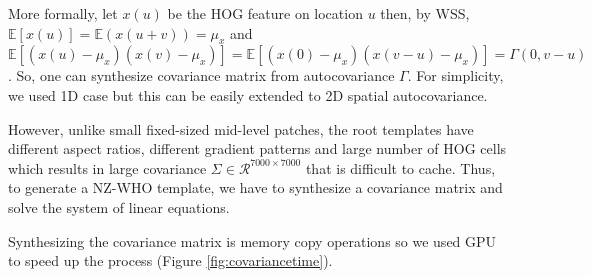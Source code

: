 \documentclass[10pt,twocolumn,letterpaper]{article}
\begin{document}

More formally, let $x(u)$ be the HOG feature on location $u$ then, by WSS, $\mathbb{E}\left[x(u)\right] = \mathbb{E}(x(u+v)) = \mu_x$ and $\mathbb{E}\left[(x(u)-\mu_x)(x(v)-\mu_x)\right]  =\mathbb{E}\left[(x(0)-\mu_x)(x(v-u)-\mu_x)\right] = \Gamma(0,v-u)$. So, one can synthesize covariance matrix from autocovariance $\Gamma$. For simplicity, we used 1D case but this can be easily extended to 2D spatial autocovariance.

However, unlike small fixed-sized mid-level patches, the root templates have different aspect ratios, different gradient patterns and large number of HOG cells which results in large covariance $\Sigma \in \mathcal{R}^{7000 \times 7000}$ that is difficult to cache. Thus, to generate a NZ-WHO template, we have to synthesize a covariance matrix and solve the system of linear equations. 

Synthesizing the covariance matrix is memory copy operations so we used GPU to speed up the process (Figure \ref{fig:covariancetime}).



\end{document}

